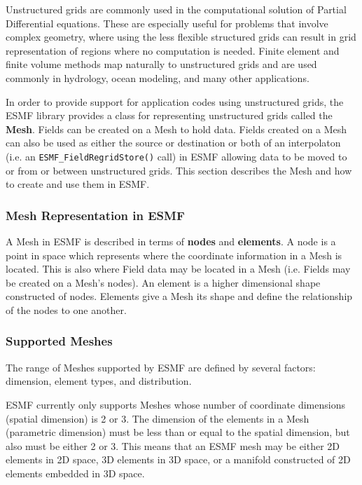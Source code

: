 
Unstructured grids are commonly used in the computational solution of Partial Differential equations.  These are especially useful for problems that involve complex geometry, where using the less flexible structured grids can
result in grid representation of regions where no computation is needed.  Finite
element and finite volume methods map naturally to unstructured grids and are used commonly
in hydrology, ocean modeling, and many other applications.

In order to provide support for application codes using unstructured grids, the ESMF library provides a class for representing 
unstructured grids called the {\bf Mesh}. Fields can be created on a Mesh to hold data. Fields created on a Mesh can also be used 
as either the source or destination or both of an interpolaton (i.e. an {\tt ESMF\_FieldRegridStore()} call) in ESMF allowing data to be 
moved to or from or between unstructured grids. This section describes the Mesh and how to create and use them in ESMF. 

\subsubsection{Mesh Representation in ESMF}

A Mesh in ESMF is described in terms of {\bf nodes} and {\bf elements}. A node is a point in space which represents where the coordinate 
information in a Mesh is located. This is also where Field data may be located in a Mesh (i.e. Fields may be created on a Mesh's nodes). An 
element is a higher dimensional shape constructed of nodes. Elements give a Mesh its shape and define the relationship of the nodes to one 
another. 

\subsubsection{Supported Meshes}

The range of Meshes supported by ESMF are defined by several factors: dimension, element types, and distribution.

ESMF currently only supports Meshes whose number of coordinate dimensions (spatial dimension) is 2 or 3. The dimension of the elements in a Mesh
(parametric dimension) must be less than or equal to the spatial dimension, but also must be either 2 or 3. This means that an ESMF mesh may be
either 2D elements in 2D space, 3D elements in 3D space, or a manifold constructed of 2D elements embedded in 3D space. 

